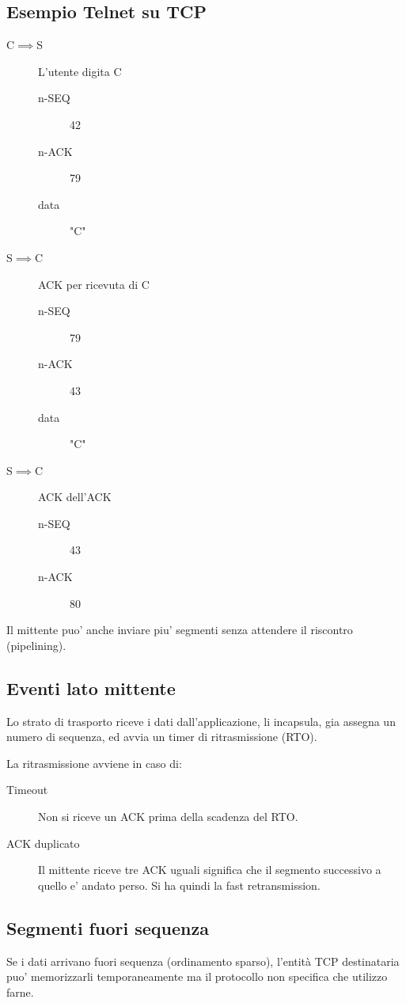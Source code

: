 \subsection{Esempio Telnet su TCP}
\begin{description}
    \item[C$\implies$S] L'utente digita C
    \begin{description}
        \item[n-SEQ] 42
        \item[n-ACK] 79
        \item[data] "C"   
    \end{description}
    \item[S$\implies$C] ACK per ricevuta di C
    \begin{description}
        \item[n-SEQ] 79
        \item[n-ACK] 43
        \item[data] "C"   
    \end{description}
    \item[S$\implies$C] ACK dell'ACK
    \begin{description}
        \item[n-SEQ] 43
        \item[n-ACK] 80
    \end{description}
\end{description}
Il mittente puo' anche inviare piu' segmenti senza attendere il riscontro (pipelining).
\subsection{Eventi lato mittente}
Lo strato di trasporto riceve i dati dall'applicazione, li incapsula, gia assegna un numero di sequenza, ed avvia un timer di ritrasmissione (RTO).

La ritrasmissione avviene in caso di:
\begin{description}
    \item[Timeout] Non si riceve un ACK prima della scadenza del RTO.
    \item[ACK duplicato] Il mittente riceve tre ACK uguali significa che il segmento successivo a quello e' andato perso. Si ha quindi la {\color{blue}fast retransmission}.  
\end{description}
\subsection{Segmenti fuori sequenza}
Se i dati arrivano fuori sequenza (ordinamento sparso), l'entità TCP destinataria puo' memorizzarli temporaneamente ma il protocollo non specifica che utilizzo farne.

